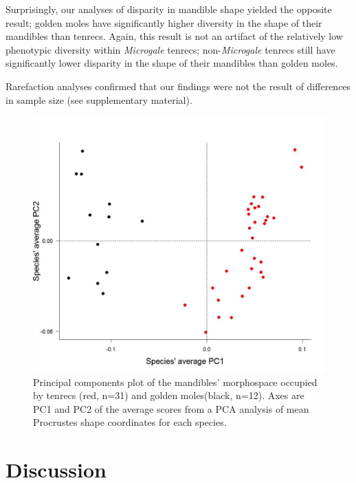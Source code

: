 \documentclass[12pt,a4paper]{article}
\begin{document}
Surprisingly, our analyses of disparity in mandible shape yielded the opposite result; golden moles have significantly higher diversity in the shape of their mandibles than tenrecs.  
Again, this result is not an artifact of the relatively low phenotypic diversity within \textit{Microgale} tenrecs; non-\textit{Microgale} tenrecs still have significantly lower disparity in the shape of their mandibles than golden moles.

Rarefaction analyses confirmed that our findings were not the result of differences in sample size (see supplementary material).


\begin{figure}[H]
\centering
\includegraphics[width=1\linewidth]{Mands_Tenrecs+Gmoles_PC1PC2_01_05_14.jpg}
\caption{Principal components plot of the mandibles' morphospace occupied by tenrecs (red, n=31) and golden moles(black, n=12). Axes are PC1 and PC2 of the average scores from a PCA analysis of mean Procrustes shape coordinates for each species. }
\label{mandsPCA}

\end{figure}



\section{Discussion} %
\end{document}
